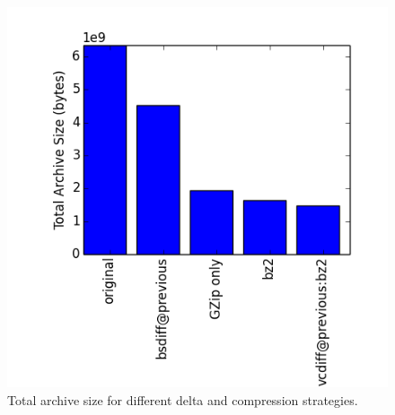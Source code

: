 \documentclass[11pt, twocolumn]{article}
\begin{document}
    \begin{figure}
      \centering
      \includegraphics[width=\linewidth]{images/tas_best.png}
      \caption{Total archive size for different delta and compression strategies.}
      \label{fig:tas_best}
    \end{figure}
\end{document}
